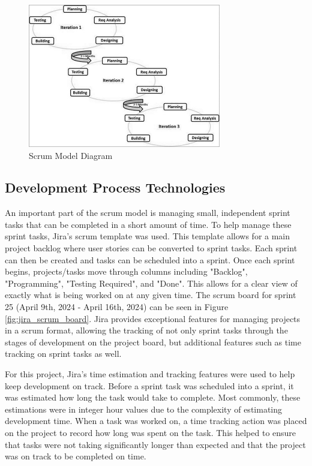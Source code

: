 \begin{figure}[htb]
    \centering
    \includegraphics[width=0.75\textwidth]{02_dev_process/res/sdlc_agile_model.jpg}
    \caption[Scrum Model Diagram]{Scrum Model Diagram \cite{tutorialspointAgile}}
    \label{fig:scrum_model}
\end{figure}

\subsection{Development Process Technologies}
An important part of the scrum model is managing small, independent sprint tasks that can be completed in a short amount of time. To help manage these sprint tasks, Jira's \cite{jira} scrum template was used. This template allows for a main project backlog where user stories can be converted to sprint tasks. Each sprint can then be created and tasks can be scheduled into a sprint. Once each sprint begins, projects/tasks move through columns including "Backlog", "Programming", "Testing Required", and "Done". This allows for a clear view of exactly what is being worked on at any given time. The scrum board for sprint 25 (April 9th, 2024 - April 16th, 2024) can be seen in Figure \ref{fig:jira_scrum_board}. Jira provides exceptional features for managing projects in a scrum format, allowing the tracking of not only sprint tasks through the stages of development on the project board, but additional features such as time tracking on sprint tasks as well.

For this project, Jira's time estimation and tracking features were used to help keep development on track. Before a sprint task was scheduled into a sprint, it was estimated how long the task would take to complete. Most commonly, these estimations were in integer hour values due to the complexity of estimating development time. When a task was worked on, a time tracking action was placed on the project to record how long was spent on the task. This helped to ensure that tasks were not taking significantly longer than expected and that the project was on track to be completed on time.

